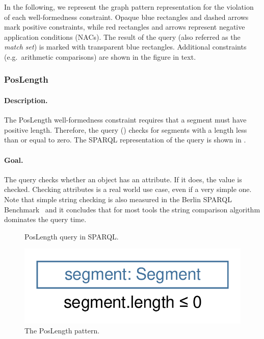 In the following, we represent the graph pattern representation for the violation of each well-formedness constraint. Opaque blue rectangles and dashed arrows mark positive constraints, while red rectangles and arrows represent negative application conditions (NACs). The result of the query (also referred as the \emph{match set}) is marked with transparent blue rectangles. Additional constraints (e.g.\ arithmetic comparisons) are shown in the figure in text.


\subsubsection{PosLength}

\paragraph{Description.} The \textsf{PosLength} well-formedness constraint requires that a segment must have positive length. Therefore, the query () checks for segments with a length less than or equal to zero. The SPARQL representation of the query is shown in .

\paragraph{Goal.} The query checks whether an object has an attribute. If it does, the value is checked. Checking attributes is a real world use case, even if a very simple one. Note that simple string checking is also measured in the Berlin SPARQL Benchmark~\cite{BSBM} and it concludes that for most tools the string comparison algorithm dominates the query time.

\begin{figure}[htb]
\centering
\begin{minipage}{0.5\textwidth}
  { \alignListing
    }
  \caption{\textsf{PosLength} query in SPARQL.}
  \label{lst:poslength-sparql}
\end{minipage}
\end{figure}

\begin{figure}[htb]
		\centering
		\includegraphics[scale=0.4]{figures/trainbenchmark-poslength}
		\caption{The \textsf{PosLength} pattern.}
		\label{fig:trainbenchmark-poslength}
\end{figure}

